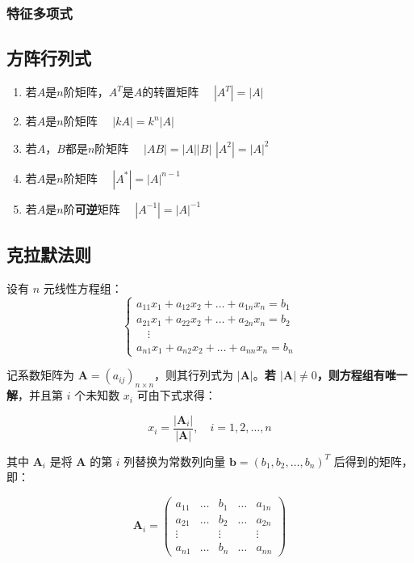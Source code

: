 \documentclass[a4paper,12pt]{article}
\begin{document}
    \subsubsection{特征多项式}

    \subsection{方阵行列式}

    \begin{enumerate}
        \item 若$A$是$n$阶矩阵，$A^T$是$A$的转置矩阵 \, \Rightarrow \, $|A^T| = |A|$
        \item 若$A$是$n$阶矩阵 \, \Rightarrow \, $|kA| = k^{n}|A|$
        \item 若$A$，$B$都是$n$阶矩阵 \, \Rightarrow \, $|AB| = |A||B|$ \;\text{,} $|A^2| = |A|^2$
        \item 若$A$是$n$阶矩阵 \, \Rightarrow \, $|A^*| = |A|^{n-1}$
        \item 若$A$是$n$阶\textbf{可逆}矩阵 \, \Rightarrow \, $|A^{-1}| = |A|^{-1}$
    \end{enumerate}

    \subsection{克拉默法则}

    设有 $n$ 元线性方程组：
    \[
        \begin{cases}
            a_{11}x_1 + a_{12}x_2 + \dots + a_{1n}x_n = b_1 \\
            a_{21}x_1 + a_{22}x_2 + \dots + a_{2n}x_n = b_2 \\
            \quad \vdots \\
            a_{n1}x_1 + a_{n2}x_2 + \dots + a_{nn}x_n = b_n
        \end{cases}
    \]

    记系数矩阵为 $\mathbf{A} = (a_{ij})_{n\times n}$，则其行列式为 $|\mathbf{A}|$。\textbf{若 $|\mathbf{A}| \neq 0$，则方程组有唯一解}，并且第 $i$ 个未知数 $x_i$ 可由下式求得：

    \[
        x_i = \frac{|\mathbf{A}_i|}{|\mathbf{A}|}, \quad i=1,2,\dots,n
    \]

    其中 $\mathbf{A}_i$ 是将 $\mathbf{A}$ 的第 $i$ 列替换为常数列向量 $\mathbf{b} = (b_1, b_2, \dots, b_n)^T$ 后得到的矩阵，即：

    \[
        \mathbf{A}_i =
        \begin{pmatrix}
            a_{11} & \dots & b_1    & \dots & a_{1n} \\
            a_{21} & \dots & b_2    & \dots & a_{2n} \\
            \vdots &       & \vdots &       & \vdots \\
            a_{n1} & \dots & b_n    & \dots & a_{nn}
        \end{pmatrix}
    \]
\end{document}

